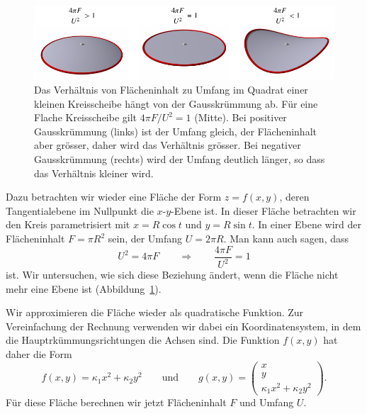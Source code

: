 \begin{figure}
\centering
\includegraphics{chapters/tikz/4pifu2.pdf}
\caption{Das Verhältnis von Flächeninhalt zu Umfang im Quadrat einer
kleinen Kreisscheibe hängt von der Gausskrümmung ab. 
Für eine Flache Kreisscheibe gilt $4\pi F/U^2=1$ (Mitte).
Bei positiver Gausskrümmung (links) ist der Umfang gleich, der Flächeninhalt
aber grösser, daher wird das Verhältnis grösser.
Bei negativer Gausskrümmung (rechts) wird der Umfang deutlich länger, so dass
das Verhältnis kleiner wird.
\label{skript:kurven:4pifu2vis}}
\end{figure}
Dazu betrachten wir wieder eine Fläche der Form $z=f(x,y)$, deren
Tangentialebene im Nullpunkt die $x$-$y$-Ebene ist.
In dieser Fläche betrachten wir den Kreis parametrisiert mit
$x=R\cos t$ und $y=R\sin t$.
In einer Ebene wird der Flächeninhalt $F=\pi R^2$ sein, der Umfang $U=2\pi R$.
Man kann auch sagen, dass
\[
U^2 = 4\pi F
\qquad\Rightarrow\qquad
\frac{4\pi F}{U^2}=1
\]
ist.
Wir untersuchen, wie sich diese Beziehung ändert, wenn die
Fläche nicht mehr eine Ebene ist (Abbildung~\ref{skript:kurven:4pifu2vis}).

Wir approximieren die Fläche wieder als quadratische Funktion.
Zur Vereinfachung der Rechnung verwenden wir dabei ein Koordinatensystem,
in dem die Hauptrkümmungsrichtungen die Achsen sind.
Die Funktion $f(x,y)$ hat daher die Form
\[
f(x,y)
=
\kappa_1 x^2 + \kappa_2 y^2
\qquad\text{und}\qquad
g(x,y)=\begin{pmatrix}x\\y\\\kappa_1x^2 + \kappa_2y^2\end{pmatrix}.
\]
Für diese Fläche berechnen wir jetzt Flächeninhalt $F$ und 
Umfang $U$.

